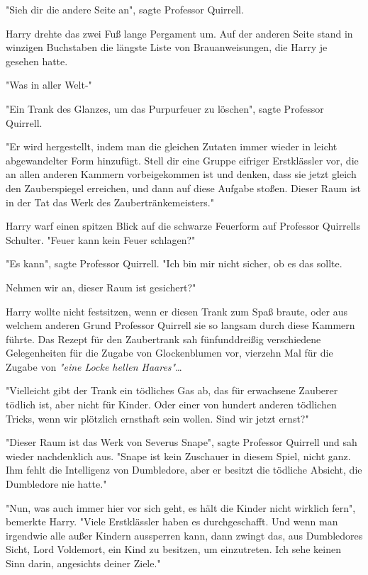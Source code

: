{"Sieh dir die andere Seite an", sagte Professor Quirrell.

Harry drehte das zwei Fuß lange Pergament um. Auf der anderen Seite stand in winzigen Buchstaben die längste Liste von Brauanweisungen, die Harry je gesehen hatte.

"Was in aller Welt-"

"Ein Trank des Glanzes, um das Purpurfeuer zu löschen", sagte Professor Quirrell.

"Er wird hergestellt, indem man die gleichen Zutaten immer wieder in leicht abgewandelter Form hinzufügt. Stell dir eine Gruppe eifriger Erstklässler vor, die an allen anderen Kammern vorbeigekommen ist und denken, dass sie jetzt gleich den Zauberspiegel erreichen, und dann auf diese Aufgabe stoßen. Dieser Raum ist in der Tat das Werk des Zaubertränkemeisters."

Harry warf einen spitzen Blick auf die schwarze Feuerform auf Professor Quirrells Schulter. "Feuer kann kein Feuer schlagen?"

"Es kann", sagte Professor Quirrell. "Ich bin mir nicht sicher, ob es das sollte.

Nehmen wir an, dieser Raum ist gesichert?"

Harry wollte nicht festsitzen, wenn er diesen Trank zum Spaß braute, oder aus welchem anderen Grund Professor Quirrell sie so langsam durch diese Kammern führte. Das Rezept für den Zaubertrank sah fünfunddreißig verschiedene Gelegenheiten für die Zugabe von Glockenblumen vor, vierzehn Mal für die Zugabe von \emph{"eine Locke hellen Haares"}…

"Vielleicht gibt der Trank ein tödliches Gas ab, das für erwachsene Zauberer tödlich ist, aber nicht für Kinder. Oder einer von hundert anderen tödlichen Tricks, wenn wir plötzlich ernsthaft sein wollen. Sind wir jetzt ernst?"

"Dieser Raum ist das Werk von Severus Snape", sagte Professor Quirrell und sah wieder nachdenklich aus. "Snape ist kein Zuschauer in diesem Spiel, nicht ganz. Ihm fehlt die Intelligenz von Dumbledore, aber er besitzt die tödliche Absicht, die Dumbledore nie hatte."

"Nun, was auch immer hier vor sich geht, es hält die Kinder nicht wirklich fern", bemerkte Harry. "Viele Erstklässler haben es durchgeschafft. Und wenn man irgendwie alle außer Kindern aussperren kann, dann zwingt das, aus Dumbledores Sicht, Lord Voldemort, ein Kind zu besitzen, um einzutreten. Ich sehe keinen Sinn darin, angesichts deiner Ziele."

}
